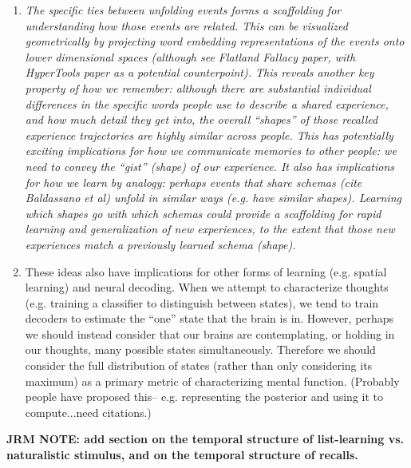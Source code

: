 \documentclass{article}
\begin{document}
\begin{enumerate}
  \item \textit{The specific ties between unfolding events forms a scaffolding for understanding how those events are related.  This can be visualized geometrically by projecting word embedding representations of the events onto lower dimensional spaces (although see Flatland Fallacy paper, with HyperTools paper as a potential counterpoint).  This reveals another key property of how we remember: although there are substantial individual differences in the specific words people use to describe a shared experience, and how much detail they get into, the overall ``shapes'' of those recalled experience trajectories are highly similar across people.  This has potentially exciting implications for how we communicate memories to other people: we need to convey the ``gist'' (shape) of our experience.  It also has implications for how we learn by analogy: perhaps events that share schemas (cite Baldassano et al) unfold in similar ways (e.g. have similar shapes).  Learning which shapes go with which schemas could provide a scaffolding for rapid learning and generalization of new experiences, to the extent that those new experiences match a previously learned schema (shape).}
    \item These ideas also have implications for other forms of learning (e.g. spatial learning) and neural decoding.  When we attempt to characterize thoughts (e.g. training a classifier to distinguish between states), we tend to train decoders to estimate the ``one'' state that the brain is in.  However, perhaps we should instead consider that our brains are contemplating, or holding in our thoughts, many possible states simultaneously.  Therefore we should consider the full distribution of states (rather than only considering its maximum) as a primary metric of characterizing mental function.  (Probably people have proposed this-- e.g. representing the posterior and using it to compute...need citations.)
    \end{enumerate}









\textbf{JRM NOTE: add section on the temporal structure of list-learning vs. naturalistic stimulus, and on the temporal structure of recalls.}
\end{document}
